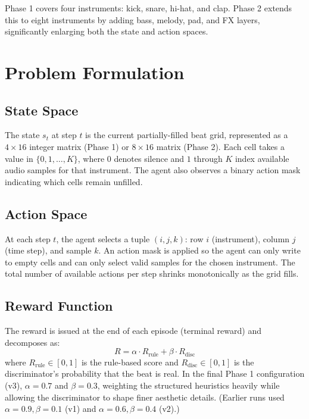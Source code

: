 \documentclass[11pt]{article}
\begin{document}
Phase 1 covers four instruments: kick, snare, hi-hat, and clap. Phase 2 extends this to eight instruments by adding bass, melody, pad, and FX layers, significantly enlarging both the state and action spaces.

\section{Problem Formulation}

\subsection{State Space}

The state $s_t$ at step $t$ is the current partially-filled beat grid, represented as a $4 \times 16$ integer matrix (Phase 1) or $8 \times 16$ matrix (Phase 2). Each cell takes a value in $\{0, 1, \ldots, K\}$, where $0$ denotes silence and $1$ through $K$ index available audio samples for that instrument. The agent also observes a binary action mask indicating which cells remain unfilled.

\subsection{Action Space}

At each step $t$, the agent selects a tuple $(i, j, k)$: row $i$ (instrument), column $j$ (time step), and sample $k$. An action mask is applied so the agent can only write to empty cells and can only select valid samples for the chosen instrument. The total number of available actions per step shrinks monotonically as the grid fills.

\subsection{Reward Function}

The reward is issued at the end of each episode (terminal reward) and decomposes as:
\[
R = \alpha \cdot R_{\text{rule}} + \beta \cdot R_{\text{disc}}
\]
where $R_{\text{rule}} \in [0, 1]$ is the rule-based score and $R_{\text{disc}} \in [0, 1]$ is the discriminator's probability that the beat is real. In the final Phase 1 configuration (v3), $\alpha = 0.7$ and $\beta = 0.3$, weighting the structured heuristics heavily while allowing the discriminator to shape finer aesthetic details. (Earlier runs used $\alpha = 0.9, \beta = 0.1$ (v1) and $\alpha = 0.6, \beta = 0.4$ (v2).)
\end{document}
